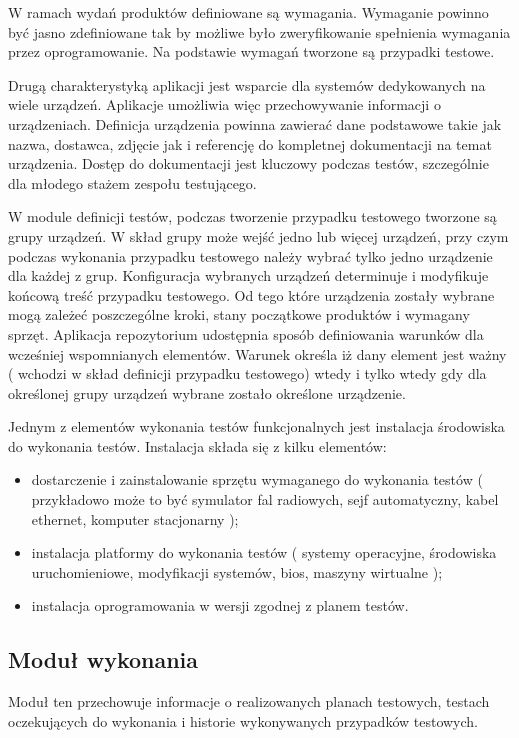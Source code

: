 W ramach wydań produktów definiowane są wymagania. Wymaganie powinno być jasno zdefiniowane tak by możliwe było zweryfikowanie spełnienia wymagania przez oprogramowanie. Na podstawie wymagań tworzone są przypadki testowe.

Drugą charakterystyką aplikacji jest wsparcie dla systemów dedykowanych na wiele urządzeń. Aplikacje umożliwia więc przechowywanie informacji o urządzeniach. Definicja urządzenia powinna zawierać dane podstawowe takie jak nazwa, dostawca, zdjęcie jak i referencję do kompletnej dokumentacji na temat urządzenia. Dostęp do dokumentacji jest kluczowy podczas testów, szczególnie dla młodego stażem zespołu testującego.

W module definicji testów, podczas tworzenie przypadku testowego tworzone są grupy urządzeń. W skład grupy może wejść jedno lub więcej urządzeń, przy czym podczas wykonania przypadku testowego należy wybrać tylko jedno urządzenie dla każdej z grup. Konfiguracja wybranych urządzeń determinuje i modyfikuje końcową treść przypadku testowego. Od tego które urządzenia zostały wybrane mogą zależeć poszczególne kroki, stany początkowe produktów i wymagany sprzęt. Aplikacja repozytorium udostępnia sposób definiowania warunków dla wcześniej wspomnianych elementów. Warunek określa iż dany element jest ważny ( wchodzi w skład definicji przypadku testowego) wtedy i tylko wtedy gdy dla określonej grupy urządzeń wybrane zostało określone urządzenie.

Jednym z elementów wykonania testów funkcjonalnych jest instalacja środowiska do wykonania testów. Instalacja składa się z kilku elementów:
\begin{itemize}
  \item dostarczenie i zainstalowanie sprzętu wymaganego do wykonania testów ( przykładowo może to być symulator fal radiowych, sejf automatyczny, kabel ethernet, komputer stacjonarny );
  \item instalacja platformy do wykonania testów ( systemy operacyjne, środowiska uruchomieniowe, modyfikacji systemów, bios, maszyny wirtualne );
  \item instalacja oprogramowania w wersji zgodnej z planem testów.
\end{itemize}

\subsection{Moduł wykonania }

Moduł ten przechowuje informacje o realizowanych planach testowych, testach oczekujących do wykonania i historie wykonywanych przypadków testowych.

